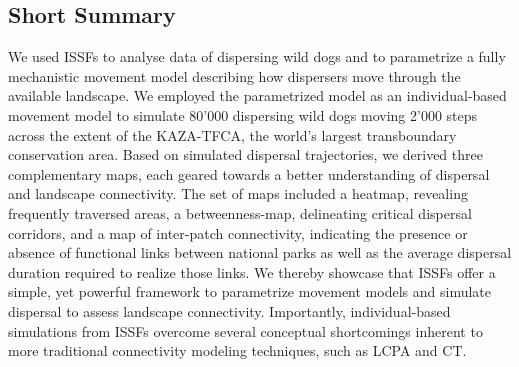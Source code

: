 \documentclass[abstract=on,10pt,a4paper,bibliography=totocnumbered]{article}
\begin{document}
\subsection{Short Summary}
We used ISSFs to analyse data of dispersing wild dogs and to parametrize a fully
mechanistic movement model describing how dispersers move through the available
landscape. We employed the parametrized model as an individual-based movement
model to simulate 80'000 dispersing wild dogs moving 2'000 steps across the
extent of the KAZA-TFCA, the world's largest transboundary conservation area.
Based on simulated dispersal trajectories, we derived three complementary maps,
each geared towards a better understanding of dispersal and landscape
connectivity. The set of maps included a heatmap, revealing frequently traversed
areas, a betweenness-map, delineating critical dispersal corridors, and a map of
inter-patch connectivity, indicating the presence or absence of functional links
between national parks as well as the average dispersal duration required to
realize those links. We thereby showcase that ISSFs offer a simple, yet powerful
framework to parametrize movement models and simulate dispersal to assess
landscape connectivity. Importantly, individual-based simulations from ISSFs
overcome several conceptual shortcomings inherent to more traditional
connectivity modeling techniques, such as LCPA and CT.

\end{document}
